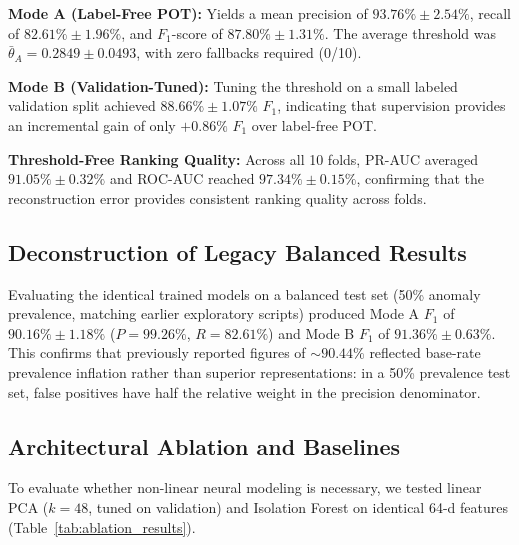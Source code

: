 \documentclass[conference]{IEEEtran}
\begin{document}
\textbf{Mode A (Label-Free POT):} Yields a mean precision of $93.76\% \pm 2.54\%$, recall of $82.61\% \pm 1.96\%$, and $F_1$-score of $87.80\% \pm 1.31\%$. The average threshold was $\bar{\theta}_A = 0.2849 \pm 0.0493$, with zero fallbacks required (0/10).

\textbf{Mode B (Validation-Tuned):} Tuning the threshold on a small labeled validation split achieved $88.66\% \pm 1.07\%$ $F_1$, indicating that supervision provides an incremental gain of only $+0.86\%$ $F_1$ over label-free POT.

\textbf{Threshold-Free Ranking Quality:} Across all 10 folds, PR-AUC averaged $91.05\% \pm 0.32\%$ and ROC-AUC reached $97.34\% \pm 0.15\%$, confirming that the reconstruction error provides consistent ranking quality across folds.

\subsection{Deconstruction of Legacy Balanced Results}
Evaluating the identical trained models on a balanced test set (50\% anomaly prevalence, matching earlier exploratory scripts) produced Mode A $F_1$ of $90.16\% \pm 1.18\%$ ($P=99.26\%$, $R=82.61\%$) and Mode B $F_1$ of $91.36\% \pm 0.63\%$. This confirms that previously reported figures of $\sim 90.44\%$ reflected base-rate prevalence inflation rather than superior representations: in a 50\% prevalence test set, false positives have half the relative weight in the precision denominator.

\subsection{Architectural Ablation and Baselines}
To evaluate whether non-linear neural modeling is necessary, we tested linear PCA ($k=48$, tuned on validation) and Isolation Forest on identical 64-d features (Table~\ref{tab:ablation_results}).
\end{document}
